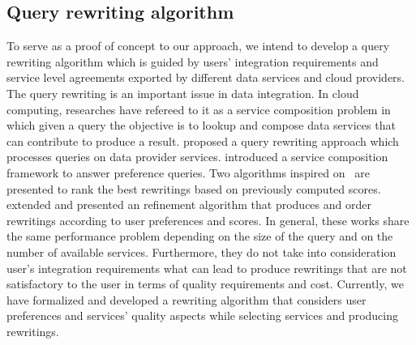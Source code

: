 
\subsection{Query rewriting algorithm}
To serve as a proof of concept to our approach, we intend to develop a query
rewriting algorithm which is guided by users' integration requirements and
service level agreements exported by different data services and cloud
providers. The query rewriting is an important issue in data integration. In
cloud computing, researches have refereed to it as a service composition problem
in which given a query the objective is to lookup and compose data services that
can contribute to produce a result. \cite{Barhamgi2010} proposed a query
rewriting approach which processes queries on data provider services.
\cite{Benouaret2011} introduced a service composition framework to answer
preference queries. Two algorithms inspired on~\cite{Barhamgi2010} are presented
to rank the best rewritings based on previously computed scores. \cite{ba2014}
extended \cite{Umberto} and presented an refinement algorithm that produces and
order rewritings according to user preferences and scores. In general, these
works share the same performance problem depending on the size of the query and
on the number of available services. Furthermore, they do not take into
consideration user's integration requirements what can lead to produce
rewritings that are not satisfactory to the user in terms of quality
requirements and cost. Currently, we have formalized and developed a rewriting
algorithm that considers user preferences and services' quality aspects while
selecting services and producing rewritings.                    

